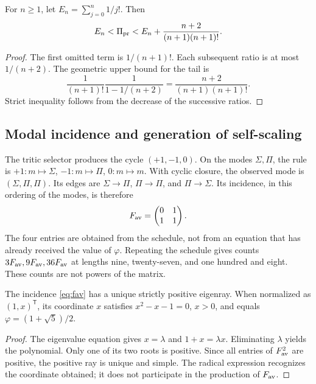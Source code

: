\begin{proposition}
For \(n\ge1\), let \(E_n=\sum_{j=0}^n1/j!\). Then
\[
 E_n<\Pi_{\rm pr}<E_n+\frac{n+2}{(n+1)(n+1)!}.
\]
\end{proposition}
\begin{proof}
The first omitted term is \(1/(n+1)!\). Each subsequent ratio is at most \(1/(n+2)\). The geometric upper bound for the tail is
\[
 \frac1{(n+1)!}\frac1{1-1/(n+2)}
 =\frac{n+2}{(n+1)(n+1)!}.
\]
Strict inequality follows from the decrease of the successive ratios.
\end{proof}

\subsection{Modal incidence and generation of self-scaling}

The tritic selector produces the cycle \((+1,-1,0)\). On the modes \(\Sigma,\Pi\), the rule is \(+1:m\mapsto\Sigma\), \(-1:m\mapsto\Pi\), \(0:m\mapsto m\). With cyclic closure, the observed mode is \((\Sigma,\Pi,\Pi)\). Its edges are \(\Sigma\to\Pi\), \(\Pi\to\Pi\), and \(\Pi\to\Sigma\). Its incidence, in this ordering of the modes, is therefore
\begin{equation}
 F_{\rm av}=\begin{pmatrix}0&1\\1&1\end{pmatrix}.
 \label{eq:fav}
\end{equation}
The four entries are obtained from the schedule, not from an equation that has already received the value of \(\varphi\). Repeating the schedule gives counts \(3F_{\rm av},9F_{\rm av},36F_{\rm av}\) at lengths nine, twenty-seven, and one hundred and eight. These counts are not powers of the matrix.

\begin{theorem}
The incidence \eqref{eq:fav} has a unique strictly positive eigenray. When normalized as \((1,x)^{\mathsf T}\), its coordinate \(x\) satisfies \(x^2-x-1=0\), \(x>0\), and equals \(\varphi=(1+\sqrt5)/2\).
\end{theorem}
\begin{proof}
The eigenvalue equation gives \(x=\lambda\) and \(1+x=\lambda x\). Eliminating \(\lambda\) yields the polynomial. Only one of its two roots is positive. Since all entries of \(F_{\rm av}^2\) are positive, the positive ray is unique and simple. The radical expression recognizes the coordinate obtained; it does not participate in the production of \(F_{\rm av}\).
\end{proof}

